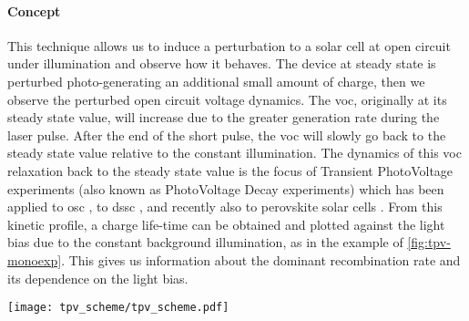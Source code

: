 	\paragraph{Concept}
	This technique allows us to induce a perturbation to a solar cell at open circuit under illumination and observe how it behaves.
	The device at steady state is perturbed photo\hyp{}generating an additional small amount of charge, then we observe the perturbed open circuit voltage dynamics.
	The \gls{voc}, originally at its steady state value, will increase due to the greater generation rate during the laser pulse.
	After the end of the short pulse, the \gls{voc} will slowly go back to the steady state value relative to the constant illumination.
	The dynamics of this \gls{voc} relaxation back to the steady state value is the focus of Transient PhotoVoltage experiments (also known as PhotoVoltage Decay experiments) which has been applied to \gls{osc} \cite{Shuttle2008}, to \gls{dssc} \cite{ORegan2005,ORegan2004,ORegan2006}, and recently also to perovskite solar cells \cite{Roiati2014a,Marin-Beloqui2014}.
	From this kinetic profile, a charge life\hyp{}time can be obtained and plotted against the light bias due to the constant background illumination, as in the example of \cref{fig:tpv-monoexp}.
	This gives us information about the dominant recombination rate and its dependence on the light bias.

	\begin{SCfigure}
		\centering
		\texttt{[image: tpv\_scheme/tpv\_scheme.pdf]}
		\label{fig:tpv_scheme}
	\end{SCfigure}

